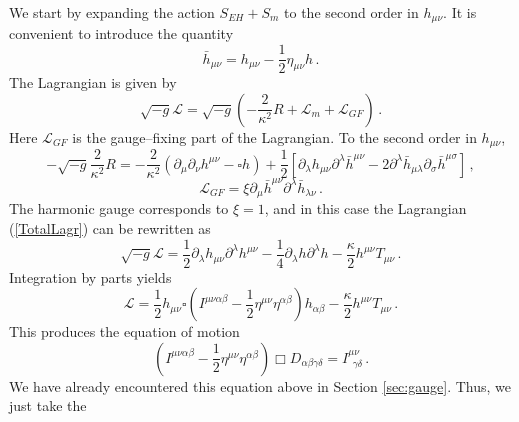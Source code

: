 \documentclass[11pt,a4paper]{article}
\begin{document}
We start by expanding the action $S_{EH}+S_m$ to the second order in $h_{\mu\nu}$. It is convenient to introduce the quantity
\begin{equation}
\bar{h}_{\mu\nu}=h_{\mu\nu}-\dfrac{1}{2}\eta_{\mu\nu}h \,.
\end{equation}
The Lagrangian is given by
\begin{equation}\label{TotalLagr}
\sqrt{-g}\mathcal{L}=\sqrt{-g}\left(-\dfrac{2}{\kappa^2}R+\mathcal{L}_m+\mathcal{L}_{GF}\right) \,.
\end{equation}
Here $\mathcal{L}_{GF}$ is the gauge--fixing part of the Lagrangian. To the second order in $h_{\mu\nu}$,
\begin{equation}
\label{eq:Rquadrat}
-\sqrt{-g}\dfrac{2}{\kappa^2}R=-\dfrac{2}{\kappa^2}(\partial_\mu\partial_\nu h^{\mu\nu}-\square h)+\dfrac{1}{2}\left[\partial_\lambda h_{\mu\nu}\partial^\lambda\bar{h}^{\mu\nu}-2\partial^\lambda\bar{h}_{\mu\lambda}\partial_\sigma\bar{h}^{\mu\sigma}\right] \,,
\end{equation}
\begin{equation}
\mathcal{L}_{GF}=\xi\partial_\mu\bar{h}^{\mu\nu}\partial^\lambda\bar{h}_{\lambda\nu} \,.
\end{equation}
The harmonic gauge corresponds to $\xi=1$, and in this case the Lagrangian (\ref{TotalLagr}) can be rewritten as
\begin{equation}
\sqrt{-g}\mathcal{L}=\dfrac{1}{2}\partial_\lambda h_{\mu\nu}\partial^\lambda h^{\mu\nu}-\dfrac{1}{4}\partial_\lambda h\partial^\lambda h-\dfrac{\kappa}{2}h^{\mu\nu}T_{\mu\nu} \,.
\end{equation}
Integration by parts yields
\begin{equation}\label{TotalLagrSimpl}
\mathcal{L}=\dfrac{1}{2}h_{\mu\nu}\square\left(I^{\mu\nu\alpha\beta}-\dfrac{1}{2}\eta^{\mu\nu}\eta^{\alpha\beta}\right)h_{\alpha\beta}-\dfrac{\kappa}{2}h^{\mu\nu}T_{\mu\nu}\,.
\end{equation}
This produces the equation of motion
\begin{equation}
 \left(I^{\mu\nu\alpha\beta}-\dfrac{1}{2}\eta^{\mu\nu}\eta^{\alpha\beta}\right)\Box  D_{\alpha\beta\gamma\delta}=I^{\mu\nu}_{~~\gamma\delta} \,.
\end{equation}
We have already encountered this equation above in Section \ref{sec:gauge}. Thus, we just take the
\end{document}
